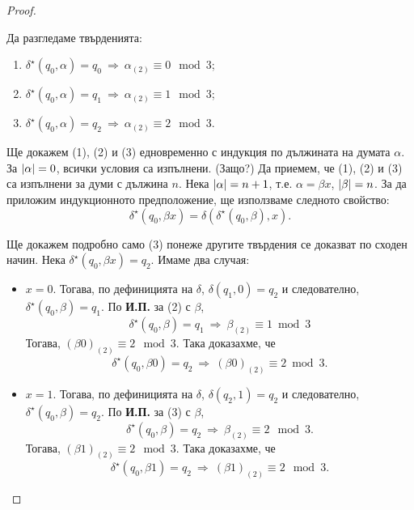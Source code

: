 \begin{proof}
\begin{figure}[H]
\begin{center}
      \end{center}
 \end{figure}
  Да разгледаме твърденията:
  \begin{enumerate}[(1)]
  \item 
    $\delta^\star(q_0,\alpha) = q_0\ \Rightarrow\ \alpha_{(2)} \equiv 0 \mod 3$;
  \item 
    $\delta^\star(q_0,\alpha) = q_1\ \Rightarrow\ \alpha_{(2)} \equiv 1 \mod 3$;
  \item 
    $\delta^\star(q_0,\alpha) = q_2\ \Rightarrow\ \alpha_{(2)} \equiv 2 \mod 3$.
  \end{enumerate}
  Ще докажем (1), (2) и (3) едновременно с индукция по дължината на думата $\alpha$.
  За $\vert{\alpha}\vert = 0$, всички условия са изпълнени. (Защо?)
  Да приемем, че (1), (2) и (3) са изпълнени за думи с дължина $n$.
  Нека $\vert{\alpha}\vert = n+1$, т.е. $\alpha = \beta x$, $\vert{\beta}\vert = n$.
  За да приложим индукционното предположение, ще използваме следното свойство:
  \[\delta^\star(q_0,\beta x) = \delta(\delta^\star(q_0,\beta),x).\]
  
  Ще докажем подробно само (3) понеже другите твърдения се доказват по сходен начин.
  Нека $\delta^\star(q_0,\beta x) = q_2$. 
  Имаме два случая:
  \begin{itemize}
  \item 
    $x = 0$. 
    Тогава, по дефиницията на $\delta$, 
    $\delta(q_1,0) = q_2$ и следователно, $\delta^\star(q_0,\beta) = q_1$.
    По {\bf И.П.} за (2) с $\beta$,
    \[\delta^\star(q_0,\beta) = q_1\ \Rightarrow\ \beta_{(2)} \equiv 1 \bmod 3\]
    Тогава, $(\beta0)_{(2)} \equiv 2 \mod 3$. Така доказахме, че
    \[\delta^\star(q_0,\beta 0) = q_2\ \Rightarrow\ (\beta 0)_{(2)} \equiv 2 \bmod 3.\]
  \item
    $x = 1$.
    Тогава, по дефиницията на $\delta$, $\delta(q_2,1) = q_2$ и следователно,
    $\delta^\star(q_0,\beta) = q_2$.
    По {\bf И.П.} за (3) с $\beta$,
    \[\delta^\star(q_0,\beta) = q_2\ \Rightarrow\ \beta_{(2)} \equiv 2 \mod 3.\]
    Тогава, $(\beta1)_{(2)} \equiv 2 \mod 3$. Така доказахме, че
    \[\delta^\star(q_0,\beta 1) = q_2\ \Rightarrow\ (\beta 1)_{(2)} \equiv 2 \mod 3.\]
  \end{itemize}
  

\end{proof}
